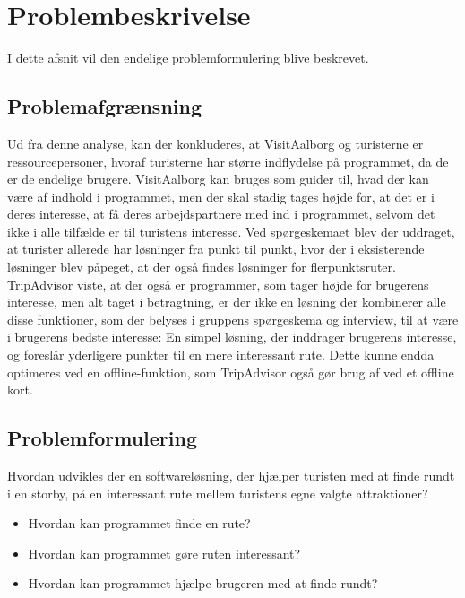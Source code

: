 \chapter{Problembeskrivelse}

I dette afsnit vil den endelige problemformulering blive beskrevet.

\section{Problemafgrænsning}
Ud fra denne analyse, kan der konkluderes, at VisitAalborg og turisterne er ressourcepersoner, hvoraf turisterne har større indflydelse på programmet, da de er de endelige brugere. VisitAalborg kan bruges som guider til, hvad der kan være af indhold i programmet, men der skal stadig tages højde for, at det er i deres interesse, at få deres arbejdspartnere med ind i programmet, selvom det ikke i alle tilfælde er til turistens interesse.
Ved spørgeskemaet blev der uddraget, at turister allerede har løsninger fra punkt til punkt, hvor der i eksisterende løsninger blev påpeget, at der også findes løsninger for flerpunktsruter. TripAdvisor viste, at der også er programmer, som tager højde for brugerens interesse, men alt taget i betragtning, er der ikke en løsning der kombinerer alle disse funktioner, som der belyses i gruppens spørgeskema og interview, til at være i brugerens bedste interesse: En simpel løsning, der inddrager brugerens interesse, og foreslår yderligere punkter til en mere interessant rute. Dette kunne endda optimeres ved en offline-funktion, som TripAdvisor også gør brug af ved et offline kort.

\section{Problemformulering}
Hvordan udvikles der en softwareløsning, der hjælper turisten med at finde rundt i en storby, på en interessant rute mellem turistens egne valgte attraktioner?
\begin{itemize}
	\item Hvordan kan programmet finde en rute?
	\item Hvordan kan programmet gøre ruten interessant?
	\item Hvordan kan programmet hjælpe brugeren med at finde rundt?
\end{itemize}
